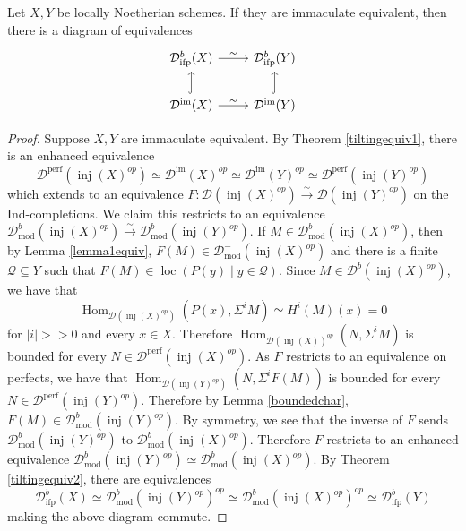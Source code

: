\documentclass[12pt,oneside]{amsart}
\DeclareMathOperator{\Hom}{Hom}
\DeclareMathOperator{\loc}{loc}
\DeclareMathOperator{\fdmod}{mod}
\DeclareMathOperator{\perf}{perf}
\DeclareMathOperator{\inj}{inj}
\DeclareMathOperator{\immac}{im}
\DeclareMathOperator{\ifp}{ifp}
\begin{document}
\begin{theorem} \label{determineschemes}
Let $X,Y$ be locally Noetherian schemes. If they are immaculate equivalent, then there is a diagram of equivalences
\[
\begin{tikzcd}
\mathcal{D}^b_{\ifp}(X) \arrow[r,"\sim"] &\mathcal{D}^b_{\ifp}(Y) \\
\mathcal{D}^{\immac}(X) \arrow[u,hook] \arrow[r,"\sim"] & \mathcal{D}^{\immac}(Y) \arrow[u,hook]
\end{tikzcd}
\]
\end{theorem}

\begin{proof} Suppose $X,Y$ are immaculate equivalent. By Theorem \ref{tiltingequiv1}, there is an enhanced equivalence 
\[
\mathcal{D}^{\perf}(\inj(X)^{op}) \simeq \mathcal{D}^{\immac}(X)^{op} \simeq \mathcal{D}^{\immac}(Y)^{op} \simeq \mathcal{D}^{\perf}(\inj(Y)^{op})
\]
which extends to an equivalence $F: \mathcal{D}(\inj(X)^{op}) \xrightarrow{\sim} \mathcal{D}(\inj(Y)^{op})$ on the Ind-completions. We claim this restricts to an equivalence $\mathcal{D}^b_{\fdmod}(\inj(X)^{op}) \xrightarrow{\sim} \mathcal{D}^b_{\fdmod}(\inj(Y)^{op})$. If $M \in \mathcal{D}^b_{\fdmod}(\inj(X)^{op})$, then by Lemma \ref{lemma1equiv}, $F(M) \in \mathcal{D}^-_{\fdmod}(\inj(X)^{op})$ and there is a finite $\mathcal{Q} \subseteq Y$ such that $F(M) \in \loc(P(y) \mid y \in \mathcal{Q})$. Since $M \in \mathcal{D}^b(\inj(X)^{op})$, we have that 
\[
\Hom_{\mathcal{D}(\inj(X)^{op})}(P(x), \Sigma^i M) \simeq H^i(M)(x) = 0
\]
for $\lvert i \rvert >> 0$ and every $x \in X$. Therefore $\Hom_{\mathcal{D}(\inj(X))^{op}}(N,\Sigma^i M)$ is bounded for every $N \in \mathcal{D}^{\perf}(\inj(X)^{op})$. As $F$ restricts to an equivalence on perfects, we have that $\Hom_{\mathcal{D}(\inj(Y)^{op})}(N,\Sigma^i F(M))$ is bounded for every $N \in \mathcal{D}^{\perf}(\inj(Y)^{op})$. Therefore by Lemma \ref{boundedchar}, $F(M) \in \mathcal{D}^b_{\fdmod}(\inj(Y)^{op})$. By symmetry, we see that the inverse of $F$ sends $\mathcal{D}^b_{\fdmod}(\inj(Y)^{op})$ to $\mathcal{D}^b_{\fdmod}(\inj(X)^{op})$. Therefore $F$ restricts to an enhanced equivalence $\mathcal{D}^b_{\fdmod}(\inj(Y)^{op}) \simeq  \mathcal{D}^b_{\fdmod}(\inj(X)^{op})$. By Theorem \ref{tiltingequiv2}, there are equivalences
\[
\mathcal{D}^b_{\ifp}(X) \simeq \mathcal{D}^b_{\fdmod}(\inj(Y)^{op})^{op} \simeq  \mathcal{D}^b_{\fdmod}(\inj(X)^{op})^{op} \simeq \mathcal{D}^b_{\ifp}(Y)
\]
making the above diagram commute.
\end{proof}
\end{document}
